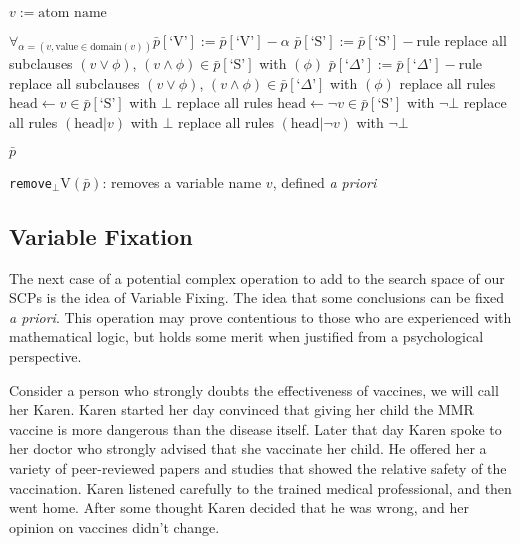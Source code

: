 \begin{algorithm}[H] 
\SetAlgoLined
{}
$v:= \text{atom name}$\;
{
$\forall_{\alpha = (v,\text{value}\in \text{domain}(v))} \bar{p}[\textrm{`V'}]:=\bar{p}[\textrm{`V'}] - \alpha$\;
{
{
$\bar{p}[\textrm{`S'}]:=\bar{p}[\textrm{`S'}]-\text{rule}$\;
}
{
replace all subclauses $(v \lor \phi)$, $(v \land \phi)\in \bar{p}[\textrm{`S'}]$ with $(\phi)$\;
}
}
{
{
$\bar{p}[\textrm{`}\Delta\textrm{'}]:=\bar{p}[\textrm{`}\Delta\textrm{'}] - \text{rule}$\;
}
{
replace all subclauses $(v \lor \phi)$, $(v \land \phi)\in \bar{p}[\textrm{`}\Delta\textrm{'}]$ with $(\phi)$\;
}
}
replace all rules $\text{head} \leftarrow v \in \bar{p}[\textrm{`S'}]$ with $\bot$\;
replace all rules $\text{head} \leftarrow \lnot v \in \bar{p}[\textrm{`S'}]$ with $\lnot \bot$\;
replace all rules $(\text{head}|v)$ with $\bot$\;
replace all rules $(\text{head}|\lnot v)$ with $\lnot \bot$\;

\Return $\bar{p}$
}

\caption{\texttt{remove}$_\bot$V$(\bar{p})$: removes a variable name $v$, defined \textit{a priori}}
\label{cogOp:removeuV}
\end{algorithm}
\subsection{Variable Fixation} \label{ssec:variableFixing}
The next case of a potential complex operation to add to the search space of our SCPs is the idea of Variable Fixing. The idea that some  conclusions can be fixed \textit{a priori}. This operation may prove contentious to those who are experienced with mathematical logic, but holds some merit when justified from a psychological perspective. 

Consider a person who strongly doubts the effectiveness of vaccines, we will call her Karen. Karen started her day convinced that giving her child the MMR vaccine is more dangerous than the disease itself. Later that day Karen spoke to her doctor who strongly advised that she vaccinate her child. He offered her a variety of peer-reviewed papers and studies that showed the relative safety of the vaccination. Karen listened carefully to the trained medical professional, and then went home. After some thought Karen decided that he was wrong, and her opinion on vaccines didn't change.

